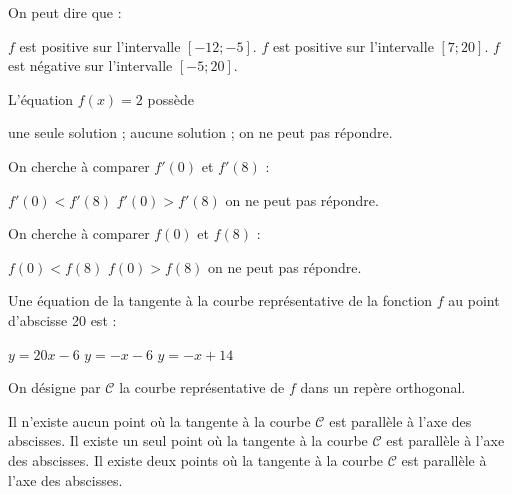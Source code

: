 \begin{questions}
	\question[1] On peut dire que :
	
		\begin{checkboxes}
			\choice $f$ est positive sur l'intervalle $[-12; -5]$.
			\choice $f$ est positive sur l'intervalle $[7; 20]$.
			\correctchoice $f$ est négative sur l'intervalle $[-5; 20]$.
		\end{checkboxes}
	
		
	\question[1] L'équation $f(x)=2$ possède 
	
	\begin{oneparcheckboxes}
		
		\correctchoice une seule solution ;
		\choice aucune solution ; 
		\choice on ne peut pas répondre.
	\end{oneparcheckboxes}	

	\question[1] On cherche à comparer $f'(0)$ et $f'(8)$ :

\begin{oneparcheckboxes}
	
	
	\choice $f'(0) < f'(8)$
	\correctchoice $f'(0) > f'(8)$
	\choice on ne peut pas répondre.
\end{oneparcheckboxes}

	\question[1] On cherche à comparer $f(0)$ et $f(8)$ :
	
	\begin{oneparcheckboxes}
		
		
		\choice $f(0) < f(8)$
		\choice $f(0) > f(8)$
		\correctchoice on ne peut pas répondre.
	\end{oneparcheckboxes}



	\question[1] Une équation de la tangente à la courbe représentative de la fonction $f$ au point d'abscisse 20 est :
	
	\begin{oneparcheckboxes}
		
		
		\choice $y = 20x - 6$
		\choice $y = -x - 6$
		\correctchoice $y = -x + 14$
	\end{oneparcheckboxes}

	\question[1] On désigne par $\mathcal{C}$ la courbe représentative de $f$ dans un repère orthogonal.
	
	\begin{oneparcheckboxes}
		
		\choice Il n'existe aucun point où la tangente à la courbe $\mathcal{C}$ est parallèle à l'axe des abscisses.
		\choice Il existe un seul point où la tangente à la courbe $\mathcal{C}$ est parallèle à l'axe des abscisses.
		\correctchoice Il existe deux points où la tangente à la courbe $\mathcal{C}$ est parallèle à l'axe des abscisses.
	\end{oneparcheckboxes}	
\end{questions}
